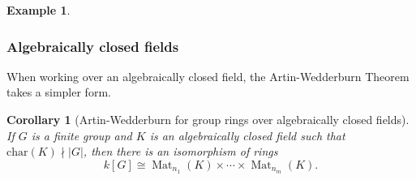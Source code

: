 \documentclass{amsart}[12pt]
\def\tor{\text{ or }}
\def\Mat{\operatorname{Mat}}
\newcommand{\R}{{\mathbb{R}}}
\newcommand{\C}{\mathbb{C}}
\numberwithin{equation}{section}
\theoremstyle{plain} %
\newtheorem{cor}[equation]{Corollary}
\theoremstyle{definition}
\newtheorem{ex}[equation]{Example}
\theoremstyle{remark}
\newcommand{\sssec}[1]{\subsubsection{#1}}
\begin{document}
\begin{ex}
%
%
%
%
%


\sssec{Algebraically closed fields}

When working over an algebraically closed field, the Artin-Wedderburn Theorem takes a simpler form. 


\begin{cor}[Artin-Wedderburn for group rings over algebraically closed fields]  If $G$ is a finite group and $K$ is an algebraically closed field such that $\mathrm{char}(K) \nmid |G|$, then
there is an isomorphism of rings
$$
k[G] \cong \Mat_{n_1}(K) \times \cdots \times \Mat_{n_m}(K).
$$


\end{cor}
\end{ex}
\end{document}
